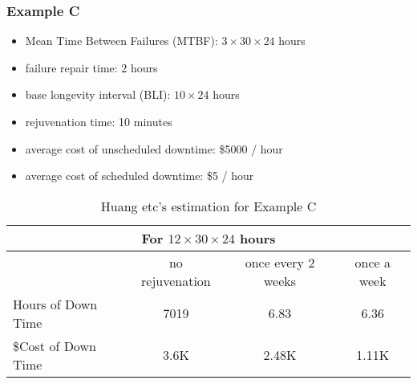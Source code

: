\subsubsection{Example C}
\begin{itemize}
  \item Mean Time Between Failures (MTBF): $3 \times 30 \times 24$ hours
  \item failure repair time:  $2$ hours
  \item base longevity interval (BLI):  $10 \times 24$ hours
  \item rejuvenation time: 10 minutes
  \item average cost of unscheduled downtime: \$5000 / hour
  \item average cost of scheduled downtime: \$5 / hour  
\end{itemize}

\begin{table}[h]
\begin{tabular}{ | l || c | c | c | }
  \hline
   \multicolumn{4}{|c|}{For $12 \times 30 \times 24 $ hours } \\
  \hline                       
    & no rejuvenation & once every 2 weeks & once a week \\
   \hline     
  Hours of Down Time  & 7019 & 6.83 & 6.36 \\
  \hline    
  \$Cost of Down Time & 3.6K  & 2.48K & 1.11K \\
  \hline  
\end{tabular}
  \caption{Huang etc's estimation for Example C}
\end{table}  
  


